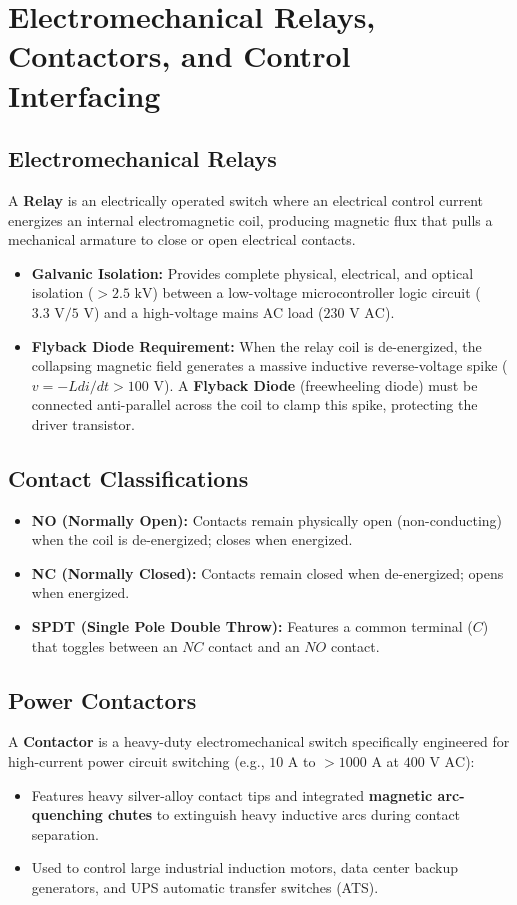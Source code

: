 \section{Electromechanical Relays, Contactors, and Control Interfacing}
\label{sec:relays_contactors}

\subsection{Electromechanical Relays}
A \textbf{Relay} is an electrically operated switch where an electrical control current energizes an internal electromagnetic coil, producing magnetic flux that pulls a mechanical armature to close or open electrical contacts.
\begin{itemize}
    \item \textbf{Galvanic Isolation:} Provides complete physical, electrical, and optical isolation ($>2.5\text{ kV}$) between a low-voltage microcontroller logic circuit ($3.3\text{ V} / 5\text{ V}$) and a high-voltage mains AC load ($230\text{ V AC}$).
    \item \textbf{Flyback Diode Requirement:} When the relay coil is de-energized, the collapsing magnetic field generates a massive inductive reverse-voltage spike ($v = -L di/dt > 100\text{ V}$). A \textbf{Flyback Diode} (freewheeling diode) must be connected anti-parallel across the coil to clamp this spike, protecting the driver transistor.
\end{itemize}

\subsection{Contact Classifications}
\begin{itemize}
    \item \textbf{NO (Normally Open):} Contacts remain physically open (non-conducting) when the coil is de-energized; closes when energized.
    \item \textbf{NC (Normally Closed):} Contacts remain closed when de-energized; opens when energized.
    \item \textbf{SPDT (Single Pole Double Throw):} Features a common terminal ($C$) that toggles between an $NC$ contact and an $NO$ contact.
\end{itemize}

\subsection{Power Contactors}
A \textbf{Contactor} is a heavy-duty electromechanical switch specifically engineered for high-current power circuit switching (e.g., $10\text{ A}$ to $>1000\text{ A}$ at $400\text{ V AC}$):
\begin{itemize}
    \item Features heavy silver-alloy contact tips and integrated \textbf{magnetic arc-quenching chutes} to extinguish heavy inductive arcs during contact separation.
    \item Used to control large industrial induction motors, data center backup generators, and UPS automatic transfer switches (ATS).
\end{itemize}

